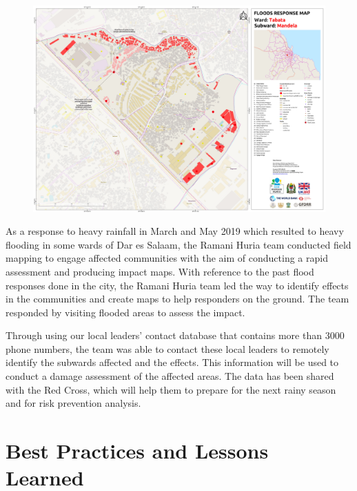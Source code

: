 \documentclass[a4paper,12pt,twoside]{article}
\begin{document}
\begin{figure}[h]
    \centering
    \includegraphics[width=.75\textwidth]{images/mandelaexample.PNG}
    \label{fig:my_label}
\end{figure}
\begin{multicols}{2}
As a response to heavy rainfall in March and May 2019 which resulted to heavy flooding in some wards of Dar es Salaam, the Ramani Huria team conducted field mapping to engage affected communities with the aim of conducting a rapid assessment and producing impact maps. With reference to the past flood responses done in the city, the Ramani Huria team led the way to identify effects in the communities and create maps to help responders on the ground. The team responded by visiting flooded areas to assess the impact.

Through using our local leaders’ contact database that contains more than 3000 phone numbers, the team was able to contact these local leaders to remotely identify the subwards affected and the effects.
This information will be used to conduct a damage assessment of the affected areas. The data has been shared with the Red Cross, which will help them to prepare for the next rainy season and for risk prevention analysis.
\end{multicols}
\section{Best Practices and Lessons Learned}
\end{document}
